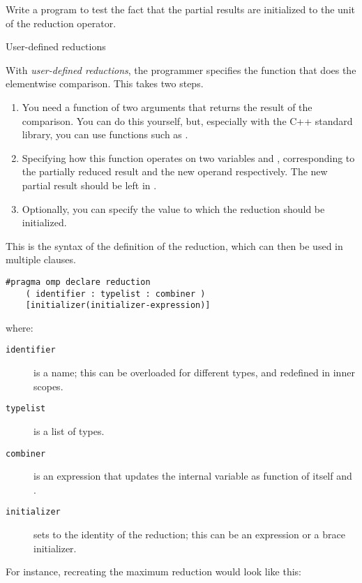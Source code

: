 \begin{exercise}
  Write a program to test the fact that the partial results
  are initialized to the unit of the reduction operator.
\end{exercise}

 {User-defined reductions}

With \emph{user-defined reductions}, the programmer specifies the
function that does the elementwise comparison.
This takes two steps.
\begin{enumerate}
\item You need a function of two arguments that returns the result of
  the comparison. You can do this yourself, but, especially with the
  C++ standard library, you can use functions such as .
\item Specifying how this function operates on two variables
   and , corresponding to the
  partially reduced result and the new operand respectively. The new
  partial result should be left in .
\item Optionally, you can specify the value to which the reduction
  should be initialized.
\end{enumerate}

This is the syntax of the definition of the reduction, which can then
be used in multiple  clauses.
\begin{lstlisting}
#pragma omp declare reduction 
    ( identifier : typelist : combiner )
    [initializer(initializer-expression)]
\end{lstlisting}
where:
\begin{description}
  \item[\texttt{identifier}] is a name; this can be overloaded for
    different types, and redefined in inner scopes.
  \item[\texttt{typelist}] is a list of types.
  \item[\texttt{combiner}] is an expression that updates the internal
    variable  as function of itself and .
  \item[\texttt{initializer}] sets  to the
    identity of the reduction; this
    can be an expression or a brace initializer.
\end{description}

For instance, recreating the maximum reduction would look like this:
%


